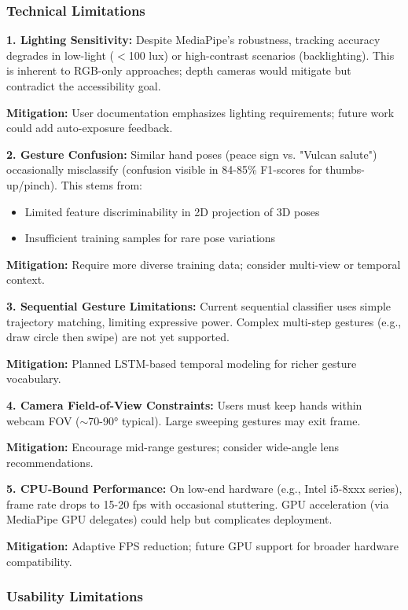 \documentclass[11pt,a4paper]{article}
\begin{document}
\subsubsection{Technical Limitations}

\textbf{1. Lighting Sensitivity:}
Despite MediaPipe's robustness, tracking accuracy degrades in low-light ($<$100 lux) or high-contrast scenarios (backlighting). This is inherent to RGB-only approaches; depth cameras would mitigate but contradict the accessibility goal.

\textbf{Mitigation:} User documentation emphasizes lighting requirements; future work could add auto-exposure feedback.

\textbf{2. Gesture Confusion:}
Similar hand poses (peace sign vs. "Vulcan salute") occasionally misclassify (confusion visible in 84-85\% F1-scores for thumbs-up/pinch). This stems from:
\begin{itemize}
\item Limited feature discriminability in 2D projection of 3D poses
\item Insufficient training samples for rare pose variations
\end{itemize}

\textbf{Mitigation:} Require more diverse training data; consider multi-view or temporal context.

\textbf{3. Sequential Gesture Limitations:}
Current sequential classifier uses simple trajectory matching, limiting expressive power. Complex multi-step gestures (e.g., draw circle then swipe) are not yet supported.

\textbf{Mitigation:} Planned LSTM-based temporal modeling for richer gesture vocabulary.

\textbf{4. Camera Field-of-View Constraints:}
Users must keep hands within webcam FOV ($\sim$70-90° typical). Large sweeping gestures may exit frame.

\textbf{Mitigation:} Encourage mid-range gestures; consider wide-angle lens recommendations.

\textbf{5. CPU-Bound Performance:}
On low-end hardware (e.g., Intel i5-8xxx series), frame rate drops to 15-20 fps with occasional stuttering. GPU acceleration (via MediaPipe GPU delegates) could help but complicates deployment.

\textbf{Mitigation:} Adaptive FPS reduction; future GPU support for broader hardware compatibility.

\subsubsection{Usability Limitations}
\end{document}
